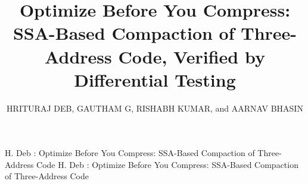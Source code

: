 \documentclass{ieeeaccess}
\begin{document}

\title{Optimize Before You Compress: SSA-Based Compaction of Three-Address Code, Verified by Differential Testing}

\author{\uppercase{Hrituraj Deb},
\uppercase{Gautham G},
\uppercase{Rishabh Kumar}, and
\uppercase{Aarnav Bhasin}}
\address[1]{School of Computer Science and Engineering, Vellore Institute of Technology, Vellore 632014, India (e-mail: hrituraj.deb2024@vitstudent.ac.in; gautham.g2024@vitstudent.ac.in; rishabh.kumar2024@vitstudent.ac.in; aarnav.bhasin2024@vitstudent.ac.in)}

\markboth
{H. Deb \headeretal: Optimize Before You Compress: SSA-Based Compaction of Three-Address Code}
{H. Deb \headeretal: Optimize Before You Compress: SSA-Based Compaction of Three-Address Code}

\end{document}
